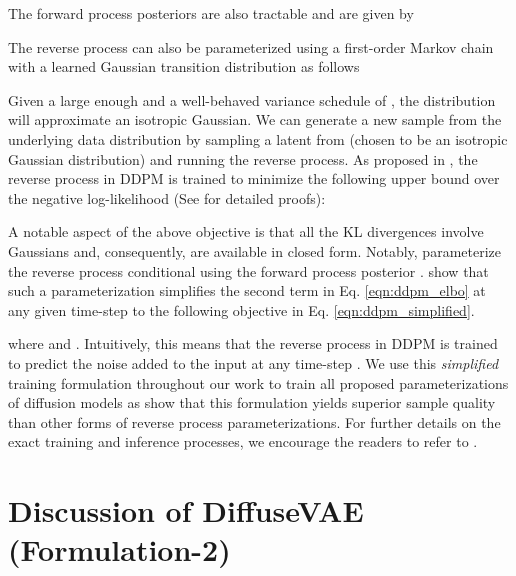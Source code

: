 \documentclass[10pt]{article} \usepackage[accepted]{tmlr}
\begin{document}
The forward process posteriors are also tractable and are given by



The reverse process  can also be parameterized using a first-order Markov chain with a learned Gaussian transition distribution as follows



Given a large enough  and a well-behaved variance schedule of , the distribution  will approximate an isotropic Gaussian. We can generate a new sample from the underlying data distribution  by sampling a latent from  (chosen to be an isotropic Gaussian distribution) and running the reverse process.
As proposed in \citep{ho2020denoising}, the reverse process in DDPM is trained to minimize the following upper bound over the negative log-likelihood (See \citep{sohldickstein2015deep} for detailed proofs):

A notable aspect of the above objective is that all the KL divergences involve Gaussians and, consequently, are available in closed form. Notably, \citep{ho2020denoising} parameterize the reverse process conditional  using the forward process posterior . \citep{ho2020denoising} show that such a parameterization simplifies the second term in Eq. \ref{eqn:ddpm_elbo} at any given time-step  to the following objective in Eq. \ref{eqn:ddpm_simplified}.


where  and . Intuitively, this means that the reverse process in DDPM is trained to predict the noise added to the input  at any time-step . 
We use this \textit{simplified} training formulation throughout our work to train all proposed parameterizations of diffusion models as \citep{ho2020denoising} show that this formulation yields superior sample quality than other forms of reverse process parameterizations. For further details on the exact training and inference processes, we encourage the readers to refer to \citep{ho2020denoising}.

\newpage
\section{Discussion of DiffuseVAE (Formulation-2)}
\label{sec:appendix_b}
\end{document}
